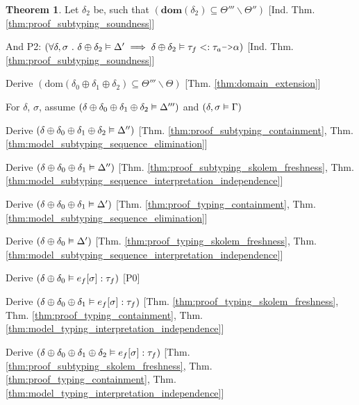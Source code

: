 \documentclass[acmsmall]{acmart}
\theoremstyle{definition}
\newtheorem{theorem}{Theorem}[section]
\begin{document}
\begin{theorem}
  \item \I \N Let $\delta_2$ be, such that $(
    \textbf{dom}(\delta_2) \subseteq \Theta''' \backslash \Theta''
  )$ [Ind. Thm. \ref{thm:proof_subtyping_soundness}]
  \item \I \N And P2: $(
    \forall \delta, \sigma \qua 
    \delta \oplus \delta_2 \satisfies \Delta' \implies
    \delta \oplus \delta_2 \satisfies \tau_f \subtypes \tau_a \J{->} \alpha
  )$ [Ind. Thm. \ref{thm:proof_subtyping_soundness}]

  \item \I \N Derive $(
    \text{dom}(\delta_0 \oplus \delta_1 \oplus \delta_2) \subseteq \Theta''' \backslash \Theta
  )$ [Thm. \ref{thm:domain_extension}]


  \item \I \N For $\delta$, $\sigma$,
    assume $(\delta \oplus \delta_0 \oplus \delta_1 \oplus \delta_2 \vDash \Delta''')$
    and $(\delta, \sigma \vDash \Gamma)$

  \item \I\I \N Derive $(
    \delta \oplus \delta_0 \oplus \delta_1 \oplus \delta_2 \vDash \Delta''
  )$ [Thm. \ref{thm:proof_subtyping_containment}, Thm. \ref{thm:model_subtyping_sequence_elimination}]

  \item \I\I \N Derive $(
    \delta \oplus \delta_0 \oplus \delta_1 \vDash \Delta''
  )$ [Thm. \ref{thm:proof_subtyping_skolem_freshness}, Thm. \ref{thm:model_subtyping_sequence_interpretation_independence}]

  \item \I\I \N Derive $(
    \delta \oplus \delta_0 \oplus \delta_1 \vDash \Delta'
  )$ [Thm. \ref{thm:proof_typing_containment}, Thm. \ref{thm:model_subtyping_sequence_elimination}]

  \item \I\I \N Derive $(
    \delta \oplus \delta_0 \vDash \Delta'
  )$ [Thm. \ref{thm:proof_typing_skolem_freshness}, Thm. \ref{thm:model_subtyping_sequence_interpretation_independence}]

  \item \I\I \N Derive $(
    \delta \oplus \delta_0 \vDash e_f[\sigma] : \tau_f
  )$ [P0]
  \item \I\I \N Derive $(
    \delta \oplus \delta_0 \oplus \delta_1 \vDash e_f[\sigma] : \tau_f
  )$ [Thm. \ref{thm:proof_typing_skolem_freshness}, 
      Thm. \ref{thm:proof_typing_containment},
      Thm. \ref{thm:model_typing_interpretation_independence}]
  \item \I\I \N Derive $(
    \delta \oplus \delta_0 \oplus \delta_1 \oplus \delta_2 \vDash e_f[\sigma] : \tau_f
  )$ [Thm. \ref{thm:proof_subtyping_skolem_freshness}, 
      Thm. \ref{thm:proof_typing_containment},
      Thm. \ref{thm:model_typing_interpretation_independence}]


\end{theorem}
\end{document}

